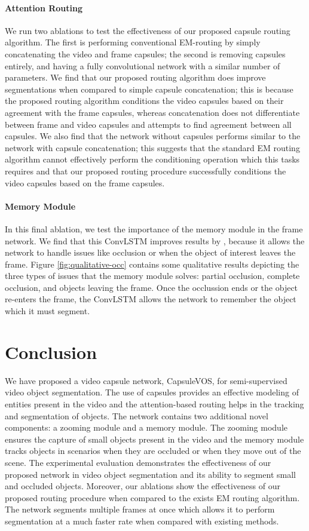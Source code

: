 \documentclass[10pt,twocolumn,letterpaper]{article}
\begin{document}
\paragraph{Attention Routing} We run two ablations to test the effectiveness of our proposed capsule routing algorithm. The first is performing conventional EM-routing by simply concatenating the video and frame capsules; the second is removing capsules entirely, and having a fully convolutional network with a similar number of parameters. We find that our proposed routing algorithm does improve segmentations when compared to simple capsule concatenation; this is because the proposed routing algorithm conditions the video capsules based on their agreement with the frame capsules, whereas concatenation does not differentiate between frame and video capsules and attempts to find agreement between all capsules. We also find that the network without capsules performs similar to the network with capsule concatenation; this suggests that the standard EM routing algorithm cannot effectively perform the conditioning operation which this tasks requires and that our proposed routing procedure successfully conditions the video capsules based on the frame capsules.

\paragraph{Memory Module} In this final ablation, we test the importance of the memory module in the frame network. We find that this ConvLSTM improves results by , because it allows the network to handle issues like occlusion or when the object of interest leaves the frame. Figure \ref{fig:qualitative-occ} contains some qualitative results depicting the three types of issues that the memory module solves: partial occlusion, complete occlusion, and objects leaving the frame. Once the occlussion ends or the object re-enters the frame, the ConvLSTM allows the network to remember the object which it must segment. 


\section{Conclusion}

We have proposed a video capsule network, CapsuleVOS, for semi-supervised video object segmentation. The use of capsules provides an effective modeling of entities present in the video and the attention-based routing helps in the tracking and segmentation of objects. The network contains two additional novel components: a zooming module and a memory module. The zooming module ensures the capture of small objects present in the video and the memory module tracks objects in scenarios when they are occluded or when they move out of the scene. The experimental evaluation demonstrates the effectiveness of our proposed network in video object segmentation and its ability to segment small and occluded objects. Moreover, our ablations show the effectiveness of our proposed routing procedure when compared to the exists EM routing algorithm. The network segments multiple frames at once which allows it to perform segmentation at a much faster rate when compared with existing methods. 
\end{document}
